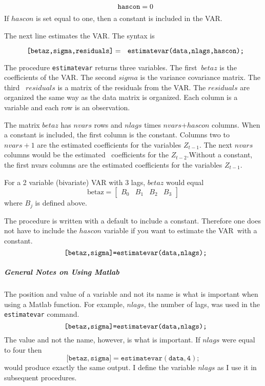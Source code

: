 \documentclass{article}
\begin{document}
\begin{equation*}
\text{\texttt{hascon}}=0
\end{equation*}
If $hascon$ is set equal to one, then a constant is included in the VAR.

The next line estimates the VAR. The syntax is

\begin{equation*}
\text{\texttt{\lbrack betaz,sigma,residuals]}}=\text{\texttt{%
estimatevar(data,nlags,hascon);}}
\end{equation*}

The procedure \texttt{estimatevar} returns three variables. The first $\
betaz$ is the coefficients of the VAR. The second $sigma$ is the variance
covariance matrix. The third \ $residuals$ is a matrix of the residuals from
the VAR. The $residuals$ are organized the same way as the data matrix is
organized. Each column is a variable and each row is an observation.

The matrix $betaz$ has $nvars$ rows and $nlags$ times $nvars$+$hascon$
columns. When a constant is included, the first column is the constant.
Columns two to $nvars+1$ are the estimated coefficients for the variables $%
Z_{t-1}$. The next $nvars$ columns would be the estimated \ coefficients for
the $Z_{t-2}.$Without a constant, the first nvars columns are the estimated
coefficients for the variables $Z_{t-1}.$

For a 2 variable (bivariate) VAR with 3 lags, $betaz$ would equal 
\begin{equation*}
\text{betaz}=\left[ 
\begin{array}{cccc}
B_{0} & B_{1} & B_{2} & B_{3}
\end{array}
\right]
\end{equation*}
where $B_{j}$ is defined above.

The procedure is written with a default to include a constant. Therefore one
does not have to include the $hascon$ variable if you want to estimate the
VAR\ with a constant. 
\begin{equation*}
\text{\texttt{\lbrack betaz,sigma]=estimatevar(data,nlags);}}
\end{equation*}

\subparagraph{General Notes on Using Matlab}

The position and value of a variable and not its name is what is important
when using a Matlab function. For example, $nlags$, the number of lags, was
used in the \texttt{estimatevar} command. 
\begin{equation*}
\text{\texttt{\lbrack betaz,sigma]=estimatevar(data,nlags);}}
\end{equation*}
The value and not the name, however, is what is important. If $nlags$ were
equal to four then 
\begin{equation*}
\mathtt{\lbrack betaz,sigma]=estimatevar(data,4);}
\end{equation*}
would produce exactly the same output. I define the variable $nlags$ as I
use it in subsequent procedures.
\end{document}
